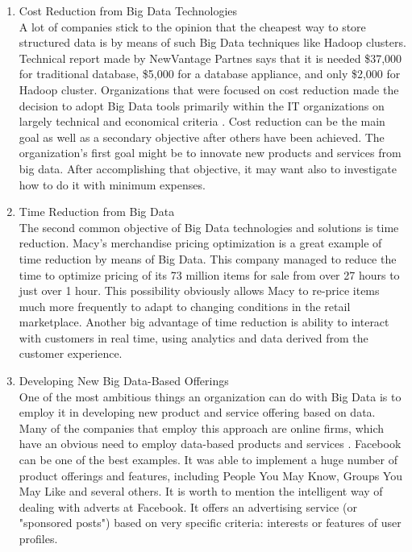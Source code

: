 \documentclass[runningheads]{llncs}
\begin{document}
\begin{enumerate}
\item Cost Reduction from Big Data Technologies\\

A lot of companies stick to the opinion that the cheapest way to store structured data is by means of such Big Data techniques like Hadoop clusters. Technical report \cite{NEWVANTAGE} made by NewVantage Partnes says that it is needed \$37,000 for traditional database, \$5,000 for a database appliance, and only \$2,000 for Hadoop cluster. Organizations that were focused on cost reduction made the decision to adopt Big Data tools primarily within the IT organizations on largely technical and economical criteria \cite{DAVENPORT}. Cost reduction can be the main goal as well as a secondary objective after others have been achieved. The organization's first goal might be to innovate new products and services from big data. After accomplishing that objective, it may want also to investigate how to do it with minimum expenses.\\

\item Time Reduction from Big Data\\

The second common objective of Big Data technologies and solutions is time reduction. Macy's merchandise pricing optimization is a great example of time reduction by means of Big Data. This company managed to reduce the time to optimize pricing of its 73 million items for sale from over 27 hours to just over 1 hour. This possibility obviously allows Macy to re-price items much more frequently to adapt to changing conditions in the retail marketplace\cite{DAVENPORT}. Another big advantage of time reduction is ability to interact with customers in real time, using analytics and data derived from the customer experience.\\

\item Developing New Big Data-Based Offerings\\

One of the most ambitious things an organization can do with Big Data is to employ it in developing new product and service offering based on data. Many of the companies that employ this approach are online firms, which have an obvious need to employ data-based products and services \cite{DAVENPORT}. Facebook can be one of the best examples. It was able to implement a huge number of product offerings and features, including People You May Know, Groups You May Like and several others. It is worth to mention the intelligent way of dealing with adverts at Facebook. It offers an advertising service (or "sponsored posts") based on very specific criteria: interests or features of user profiles. 


\end{enumerate}
\end{document}
